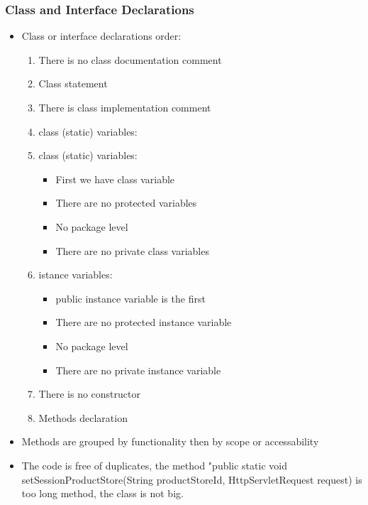 \subsubsection{Class and Interface Declarations}
\begin{itemize}
\item Class or interface declarations order:\\
\begin{enumerate}
\item There is no class documentation comment\\
\item Class statement\\
\item There is class implementation comment\\

\item class (static) variables:
\item class (static) variables:
\begin{itemize}
\item First we have class variable
\item There are no protected variables
\item No package level 
\item There are no private class variables
\end{itemize}
\item istance variables:
\begin{itemize}
\item public instance variable is the first
\item There are no protected instance variable
\item No package level 
\item There are no private instance variable 
\end{itemize}
\item There is no constructor
\item Methods declaration
\end{enumerate}
\item Methods are grouped by functionality then by scope or accessability
\item The code is free of duplicates, the method "public static void setSessionProductStore(String productStoreId, HttpServletRequest request) is too long method, the class is not big. 
\end{itemize}





